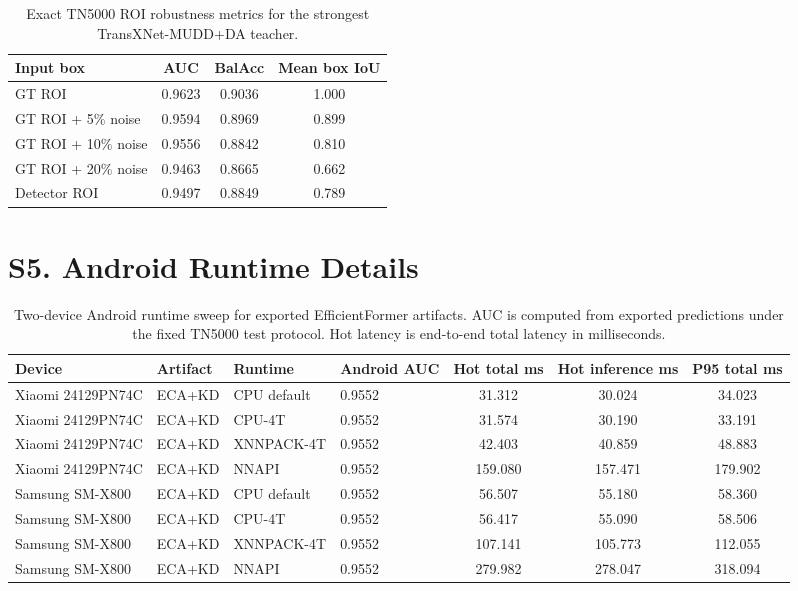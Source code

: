 \documentclass[preprint,12pt]{elsarticle}
\newcommand{\suppsection}[1]{\Needspace{0.35\textheight}\section*{#1}}
\begin{document}
\begin{table}[H]
    \centering
    \small
    \caption{Exact TN5000 ROI robustness metrics for the strongest TransXNet-MUDD+DA teacher.}
    \label{tab:s_roi_robustness_exact}
    \begin{tabular}{lccc}
        \toprule
        Input box & AUC & BalAcc & Mean box IoU \\
        \midrule
        GT ROI & 0.9623 & 0.9036 & 1.000 \\
        GT ROI + 5\% noise & 0.9594 & 0.8969 & 0.899 \\
        GT ROI + 10\% noise & 0.9556 & 0.8842 & 0.810 \\
        GT ROI + 20\% noise & 0.9463 & 0.8665 & 0.662 \\
        Detector ROI & 0.9497 & 0.8849 & 0.789 \\
        \bottomrule
    \end{tabular}
\end{table}

\suppsection{S5. Android Runtime Details}

\begin{table}[H]
    \centering
    \small
    \caption{Two-device Android runtime sweep for exported EfficientFormer artifacts. AUC is computed from exported predictions under the fixed TN5000 test protocol. Hot latency is end-to-end total latency in milliseconds.}
    \label{tab:s_android_runtime}
    \begin{adjustbox}{max width=\columnwidth}
    \begin{tabular}{llllccc}
        \toprule
        Device & Artifact & Runtime & Android AUC & Hot total ms & Hot inference ms & P95 total ms \\
        \midrule
        Xiaomi 24129PN74C & ECA+KD & CPU default & 0.9552 & 31.312 & 30.024 & 34.023 \\
        Xiaomi 24129PN74C & ECA+KD & CPU-4T & 0.9552 & 31.574 & 30.190 & 33.191 \\
        Xiaomi 24129PN74C & ECA+KD & XNNPACK-4T & 0.9552 & 42.403 & 40.859 & 48.883 \\
        Xiaomi 24129PN74C & ECA+KD & NNAPI & 0.9552 & 159.080 & 157.471 & 179.902 \\
        Samsung SM-X800 & ECA+KD & CPU default & 0.9552 & 56.507 & 55.180 & 58.360 \\
        Samsung SM-X800 & ECA+KD & CPU-4T & 0.9552 & 56.417 & 55.090 & 58.506 \\
        Samsung SM-X800 & ECA+KD & XNNPACK-4T & 0.9552 & 107.141 & 105.773 & 112.055 \\
        Samsung SM-X800 & ECA+KD & NNAPI & 0.9552 & 279.982 & 278.047 & 318.094 \\
        \bottomrule
    \end{tabular}
    \end{adjustbox}
\end{table}
\end{document}
